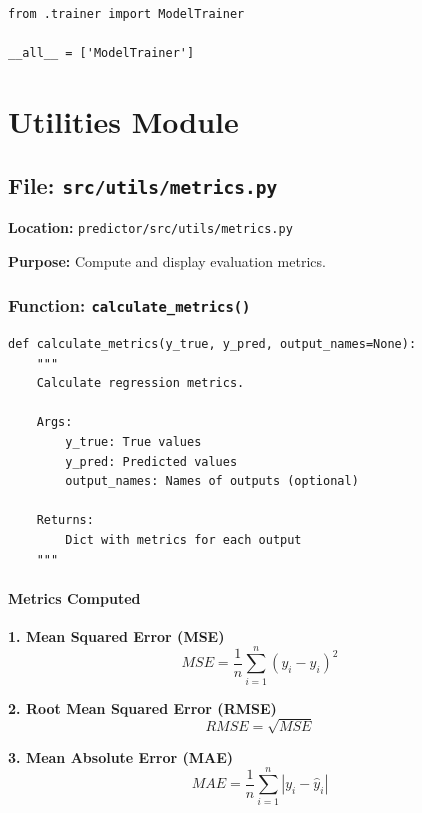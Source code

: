 \documentclass[11pt,a4paper]{article}
\begin{document}
\begin{lstlisting}
from .trainer import ModelTrainer

__all__ = ['ModelTrainer']
\end{lstlisting}

\newpage
\section{Utilities Module}

\subsection{File: \texttt{src/utils/metrics.py}}

\textbf{Location:} \texttt{predictor/src/utils/metrics.py}

\textbf{Purpose:} Compute and display evaluation metrics.

\subsubsection{Function: \texttt{calculate\_metrics()}}

\begin{lstlisting}
def calculate_metrics(y_true, y_pred, output_names=None):
    """
    Calculate regression metrics.

    Args:
        y_true: True values
        y_pred: Predicted values
        output_names: Names of outputs (optional)

    Returns:
        Dict with metrics for each output
    """
\end{lstlisting}

\paragraph{Metrics Computed}

\textbf{1. Mean Squared Error (MSE)}
\begin{equation}
MSE = \frac{1}{n}\sum_{i=1}^{n}(y_i - \hat{y}_i)^2
\end{equation}

\textbf{2. Root Mean Squared Error (RMSE)}
\begin{equation}
RMSE = \sqrt{MSE}
\end{equation}

\textbf{3. Mean Absolute Error (MAE)}
\begin{equation}
MAE = \frac{1}{n}\sum_{i=1}^{n}|y_i - \hat{y}_i|
\end{equation}
\end{document}

